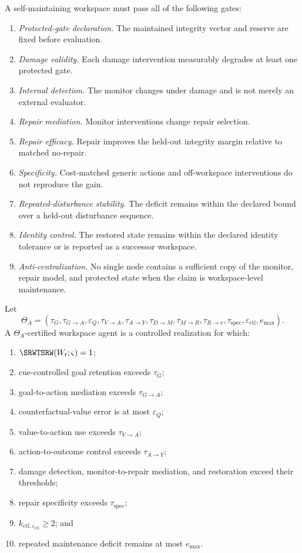 
A self-maintaining workspace must pass all of the following gates:
\begin{enumerate}
\item \emph{Protected-gate declaration.} The maintained integrity vector and
 reserve are fixed before evaluation.
\item \emph{Damage validity.} Each damage intervention measurably degrades at
 least one protected gate.
\item \emph{Internal detection.} The monitor changes under damage and is not
 merely an external evaluator.
\item \emph{Repair mediation.} Monitor interventions change repair selection.
\item \emph{Repair efficacy.} Repair improves the held-out integrity margin
 relative to matched no-repair.
\item \emph{Specificity.} Cost-matched generic actions and off-workspace
 interventions do not reproduce the gain.
\item \emph{Repeated-disturbance stability.} The deficit remains within the
 declared bound over a held-out disturbance sequence.
\item \emph{Identity control.} The restored state remains within the declared
 identity tolerance or is reported as a successor workspace.
\item \emph{Anti-centralization.} No single node contains a sufficient copy
 of the monitor, repair model, and protected state when the claim is
 workspace-level maintenance.
\end{enumerate}


Let
\[
\Theta_A
=
\left(
\tau_G,
\tau_{G\to A},
\varepsilon_Q,
\tau_{V\to A},
\tau_{A\to Y},
\tau_{D\to M},
\tau_{M\to R},
\tau_{R\to v},
\tau_{\mathrm{spec}},
\varepsilon_{\mathrm{ctl}},
 e_{\max}
\right).
\]
A \(\Theta_A\)-certified workspace agent is a controlled realization for
which:
\begin{enumerate}
\item \(\SRWTSRW(W_t;\varsigma)=1\);
\item cue-controlled goal retention exceeds \(\tau_G\);
\item goal-to-action mediation exceeds \(\tau_{G\to A}\);
\item counterfactual-value error is at most \(\varepsilon_Q\);
\item value-to-action use exceeds \(\tau_{V\to A}\);
\item action-to-outcome control exceeds \(\tau_{A\to Y}\);
\item damage detection, monitor-to-repair mediation, and restoration exceed
 their thresholds;
\item repair specificity exceeds \(\tau_{\mathrm{spec}}\);
\item \(k_{\mathrm{ctl},\varepsilon_{\mathrm{ctl}}}\geq2\); and
\item repeated maintenance deficit remains at most \(e_{\max}\).
\end{enumerate}

